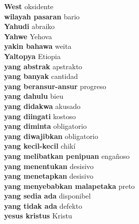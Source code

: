 \textbf{ West  } oksidente \\
\textbf{ wilayah pasaran  } bario \\
\textbf{ Yahudi  } abraiko \\
\textbf{ Yahwe  } Yehova \\
\textbf{ yakin bahawa  } weita \\
\textbf{ Yaltopya  } Etiopia \\
\textbf{ yang abstrak  } apstrakto \\
\textbf{ yang banyak  } cantidad \\
\textbf{ yang beransur-ansur  } progreso \\
\textbf{ yang dahulu  } bieu \\
\textbf{ yang didakwa  } akusado \\
\textbf{ yang diingati  } kostoso \\
\textbf{ yang diminta  } obligatorio \\
\textbf{ yang diwajibkan  } obligatorio \\
\textbf{ yang kecil-kecil  } chikí \\
\textbf{ yang melibatkan penipuan  } engañoso \\
\textbf{ yang menentukan  } desisivo \\
\textbf{ yang menetapkan  } desisivo \\
\textbf{ yang menyebabkan malapetaka  } preto \\
\textbf{ yang sedia ada  } disponibel \\
\textbf{ yang tidak ada  } defekto \\
\textbf{ yesus kristus  } Kristu \\
